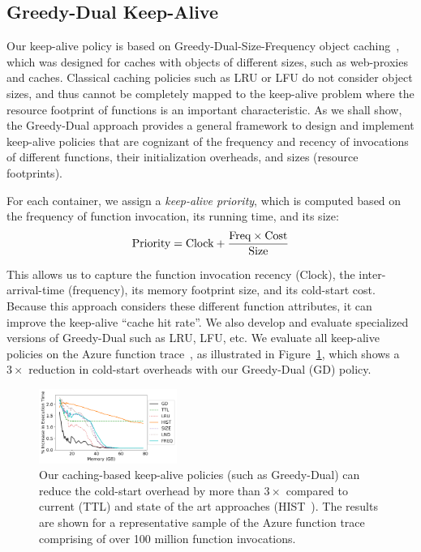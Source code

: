 \documentclass[pageno]{jpaper}
\begin{document}
\subsection{Greedy-Dual Keep-Alive}
\vspace*{\subsecspace}

Our keep-alive policy is based on Greedy-Dual-Size-Frequency object caching~\cite{gdsf}, which was designed for caches with objects of  different sizes, such as web-proxies and caches. 
Classical caching policies such as LRU or LFU do not consider object sizes, and thus cannot be completely mapped to the keep-alive problem where the resource footprint of functions is an important characteristic. 
As we shall show, the Greedy-Dual approach provides a general framework to design and implement keep-alive policies that are cognizant of the  frequency and recency of invocations of different functions, their initialization overheads, and sizes (resource footprints). 

For each container, we assign a \emph{keep-alive priority}, which is computed based on the frequency of function invocation, its running time, and its size:
%
\vspace*{-7pt}
\begin{equation}
  \vspace*{-3pt}
  \text{Priority} = \text{Clock} + \frac{\text{Freq} \times \text{Cost}} {\text{Size}}
    \label{eq:prio-prop}
\end{equation}

This allows us to capture the function invocation recency (Clock), the inter-arrival-time (frequency), its memory footprint size, and its cold-start cost. 
Because this approach considers these different function attributes, it can improve the keep-alive ``cache hit rate''.
We also develop and evaluate specialized versions of Greedy-Dual such as LRU, LFU, etc. 
We evaluate all keep-alive policies on the Azure function trace~\cite{shahrad_serverless_2020}, as  illustrated in Figure~\ref{fig:392-b-trace}, which shows a $3\times$ reduction in cold-start overheads with our Greedy-Dual (GD) policy. 

\begin{figure}[t]
  \centering
      \vspace*{\myfigspace}
\includegraphics[width=0.4\textwidth]{../graphs/rep-funcs-392/exec_inc_mem-392-legend.pdf}
  \caption{Our caching-based keep-alive policies (such as Greedy-Dual) can reduce the cold-start overhead by more than $3\times$ compared to current (TTL) and state of the art approaches (HIST~\cite{shahrad_serverless_2020}). The results are shown for a representative sample of the Azure function trace comprising of over 100 million function invocations.}
  \label{fig:392-b-trace}
\end{figure}
\end{document}
